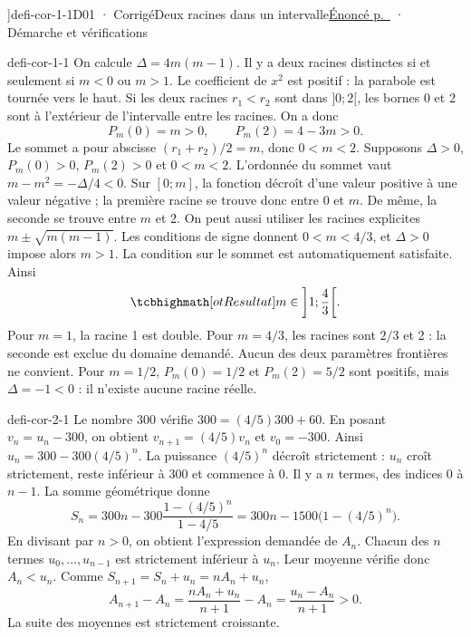 \editionPage[\pdfbookmark[0]{Corrigés des défis}{bm-corriges-defis}]{defi-cor-1-1}{D01 · Corrigé}{Deux racines dans un intervalle}{\hyperref[defi-ex-1]{Énoncé p.~\pageref*{defi-ex-1}} · Démarche et vérifications}
\begin{blocEdition}{defi-cor-1-1}
On calcule $\Delta=4m(m-1)$. Il y a deux racines distinctes si et seulement si
$m<0$ ou $m>1$. Le coefficient de $x^2$ est positif : la parabole est tournée vers le haut.
Si les deux racines $r_1<r_2$ sont dans $]0;2[$, les bornes 0 et 2 sont à l'extérieur
de l'intervalle entre les racines. On a donc
\[P_m(0)=m>0,\qquad P_m(2)=4-3m>0.\]
Le sommet a pour abscisse $(r_1+r_2)/2=m$, donc $0<m<2$.
Supposons $\Delta>0$, $P_m(0)>0$, $P_m(2)>0$ et $0<m<2$.
L'ordonnée du sommet vaut $m-m^2=-\Delta/4<0$. Sur $[0;m]$, la fonction
décroît d'une valeur positive à une valeur négative ; la première racine se trouve
donc entre 0 et $m$. De même, la seconde se trouve entre $m$ et 2.
On peut aussi utiliser les racines explicites $m\pm\sqrt{m(m-1)}$.
Les conditions de signe donnent $0<m<4/3$, et $\Delta>0$ impose alors $m>1$.
La condition sur le sommet est automatiquement satisfaite. Ainsi
\[\res{m\in\left]1;\frac43\right[}.\]
Pour $m=1$, la racine 1 est double. Pour $m=4/3$, les racines sont $2/3$ et 2 :
la seconde est exclue du domaine demandé. Aucun des deux paramètres frontières ne convient.
Pour $m=1/2$, $P_m(0)=1/2$ et $P_m(2)=5/2$ sont positifs, mais $\Delta=-1<0$ :
il n'existe aucune racine réelle.
\end{blocEdition}

\begin{blocEdition}{defi-cor-2-1}
Le nombre 300 vérifie $300=(4/5)300+60$. En posant $v_n=u_n-300$,
on obtient $v_{n+1}=(4/5)v_n$ et $v_0=-300$.
Ainsi $u_n=300-300(4/5)^n$. La puissance $(4/5)^n$ décroît strictement :
$u_n$ croît strictement, reste inférieur à 300 et commence à 0.
Il y a $n$ termes, des indices 0 à $n-1$. La somme géométrique donne
\[S_n=300n-300\frac{1-(4/5)^n}{1-4/5}
=300n-1500\bigl(1-(4/5)^n\bigr).\]
En divisant par $n>0$, on obtient l'expression demandée de $A_n$.
Chacun des $n$ termes $u_0,\ldots,u_{n-1}$ est strictement inférieur à $u_n$.
Leur moyenne vérifie donc $A_n<u_n$.
Comme $S_{n+1}=S_n+u_n=nA_n+u_n$,
\[A_{n+1}-A_n=\frac{nA_n+u_n}{n+1}-A_n
=\frac{u_n-A_n}{n+1}>0.\]
La suite des moyennes est strictement croissante.
\end{blocEdition}

